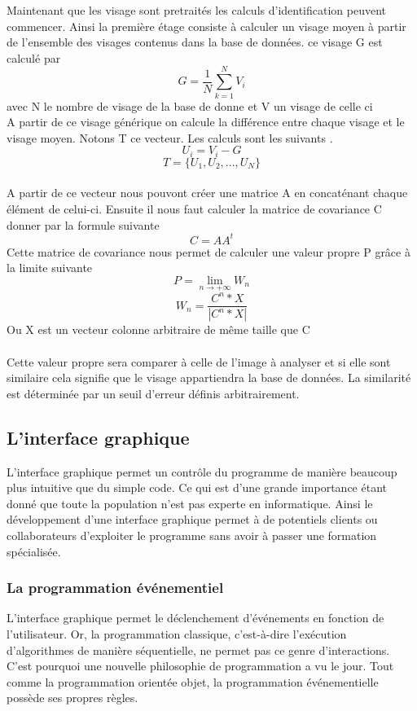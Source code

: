\documentclass[12pt,a4paper]{article}
\begin{document}
Maintenant que les visage sont pretraités les calculs d'identification peuvent commencer. Ainsi la première étage consiste à calculer un visage moyen à partir de l'ensemble des visages contenus dans la base de données. ce visage G est calculé par \[ G = \frac{1}{N}\sum_{k=1}^{N} V_{i}\]  avec N le nombre de visage de la base de donne et V un visage de celle ci\\
A partir de ce visage générique on calcule la différence entre chaque visage et le visage moyen. Notons T ce vecteur. Les calculs sont les suivants . \[ U_{i} = V_{i} - G\] \[ T = \{ U_{1}, U_{2}, ..., U_{N}\}\]\\
A partir de ce vecteur nous pouvont créer une matrice A en concaténant chaque élément de celui-ci. Ensuite il nous faut calculer la matrice de covariance C donner par la formule suivante \[ C = AA^{t} \] Cette matrice de covariance nous permet de calculer une valeur propre P grâce à la limite suivante \[P =\lim_{n \to +\infty} W_ {n}\] \[W_{n} = \frac{C^{n} * X }{| C^{n} *X |}\]
Ou X est un vecteur colonne arbitraire de même taille que C \\\\  Cette valeur propre sera comparer à celle de l'image à analyser et si elle sont similaire cela signifie que le visage appartiendra la base de données. La similarité est déterminée par un seuil d'erreur définis arbitrairement.

\newpage
\subsection{L'interface graphique}
L'interface graphique permet un contrôle du programme de manière beaucoup plus intuitive que du simple code. Ce qui est d'une grande importance étant donné que toute la population n'est pas experte en informatique. Ainsi le développement d'une interface graphique permet à de potentiels clients ou collaborateurs d'exploiter le programme sans avoir à passer une formation spécialisée. 

\subsubsection{La programmation événementiel}
L'interface graphique permet le déclenchement d'événements en fonction de l'utilisateur. Or, la programmation classique, c'est-à-dire l'exécution d'algorithmes de manière séquentielle, ne permet pas ce genre d'interactions.  C'est pourquoi une nouvelle philosophie de programmation a vu le jour. Tout comme la programmation orientée objet, la programmation événementielle possède ses propres règles.
\end{document}
